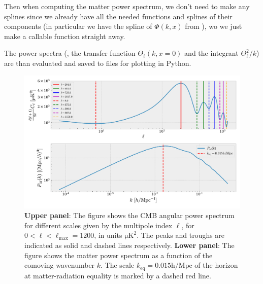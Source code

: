 \documentclass[twocolumn]{aastex62}
\begin{document}
Then when computing the matter power spectrum, we don't need to make any splines since we already have all the needed functions and splines of their components (in particular we have the spline of $\Phi(k, x)$ from \cite{stutzer:2020c}), wo we just make a callable function straight away. 

The power spectra (, the transfer function $\Theta_\ell(k, x = 0)$ and the integrant $\Theta_\ell^2 / k$) are than evaluated and saved to files for plotting in Python.

\begin{figure}
    \includegraphics[scale = 0.65]{Figures/Cell.pdf}
    \caption{\textbf{Upper panel}: The figure shows the CMB angular power spectrum for different scales given by the multipole index $\ell$, for $0 < \ell < \ell_\text{max} = 1200$, in units $\mathrm{\mu K}^2$. The peaks and troughs are indicated as solid and dashed lines respectively. \textbf{Lower panel}: The figure shows the matter power spectrum as a function of the comoving wavenumber $k$. The scale $k_\text{eq} = 0.015 \mathrm{h / Mpc}$ of the horizon at matter-radiation equality is marked by a dashed red line.} 
    \label{fig:Cell}
\end{figure}
\end{document}
